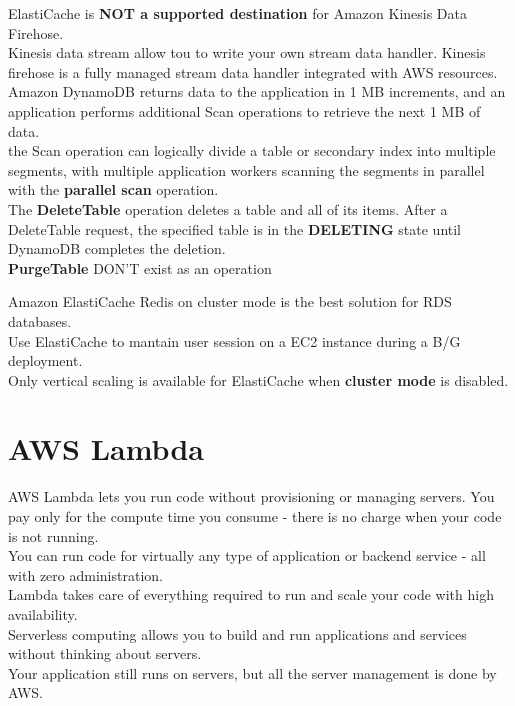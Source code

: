 \documentclass[12pt, letterpaper, twoside]{article}
\begin{document}
ElastiCache is \textbf{NOT a supported destination} for Amazon Kinesis Data Firehose.\\

Kinesis data stream allow tou to write your own stream data handler. Kinesis firehose is a fully managed stream
data handler integrated with AWS resources.\\

Amazon DynamoDB returns data to the application in 1 MB increments, and an application performs additional Scan 
operations to retrieve the next 1 MB of data.\\
the Scan operation can logically divide a table or secondary index into multiple segments, with multiple application 
workers scanning the segments in parallel with the \textbf{parallel scan} operation.\\

The \textbf{DeleteTable} operation deletes a table and all of its items. After a DeleteTable request, the specified 
table is in the \textbf{DELETING} state until DynamoDB completes the deletion.\\
\textbf{PurgeTable} DON'T exist as an operation

Amazon ElastiCache Redis on cluster mode is the best solution for RDS databases.\\ 

Use ElastiCache to mantain user session on a EC2 instance during a B/G deployment.\\

Only vertical scaling is available for ElastiCache when \textbf{cluster mode} is disabled.\\

\section{AWS Lambda}
AWS Lambda lets you run code without provisioning or managing servers. You pay only for the compute time you consume - there is no charge 
when your code is not running.\\
You can run code for virtually any type of application or backend service - all with zero administration.\\
Lambda takes care of everything required to run and scale your code with high availability.\\

Serverless computing allows you to build and run applications and services without thinking about servers.\\
Your application still runs on servers, but all the server management is done by AWS.\\
\end{document}
